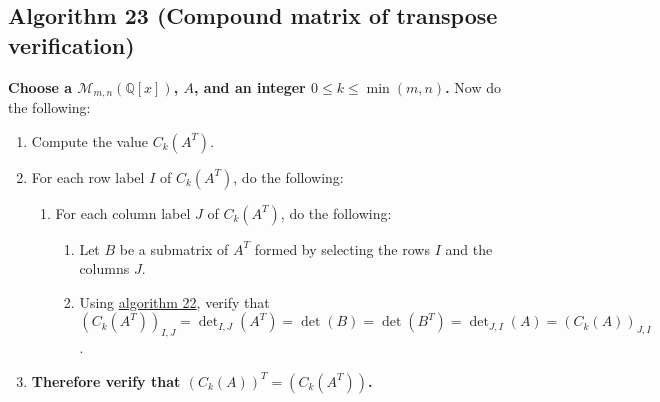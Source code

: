 \documentclass[twocolumn]{article}
\begin{document}
		\subsection{Algorithm 23 (Compound matrix of transpose verification)}\label{sec:algorithm 23}
			\textbf{Choose a $\mathcal{M}_{m,n}(\mathbb{Q}[x])$, $A$, and an integer $0\le k\le\min(m,n)$.} Now do the following:
			\begin{enumerate}
				\item Compute the value $C_k(A^T)$.
				\item For each row label $I$ of $C_k(A^T)$, do the following:
				\begin{enumerate}
					\item For each column label $J$ of $C_k(A^T)$, do the following:
					\begin{enumerate}
						\item Let $B$ be a submatrix of $A^T$ formed by selecting the rows $I$ and the columns $J$.
						\item Using \hyperref[sec:algorithm 22]{algorithm 22}, verify that $(C_k(A^T))_{I,J}=\det_{I,J}(A^T)=\det(B)=\det(B^T)=\det_{J,I}(A)=(C_k(A))_{J,I}$.
					\end{enumerate}
				\end{enumerate}
				\item \textbf{Therefore verify that $(C_k(A))^T=(C_k(A^T))$.}
			\end{enumerate}
\end{document}
